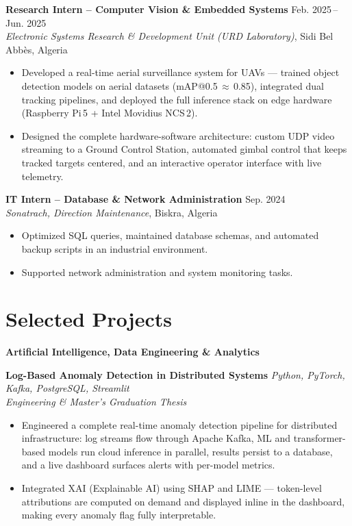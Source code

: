 \documentclass[10pt, letterpaper]{article}
\begin{document}
\textbf{Research Intern -- Computer Vision \& Embedded Systems} \hfill Feb. 2025\,--\,Jun. 2025\\
\textit{Electronic Systems Research \& Development Unit (URD Laboratory)}, Sidi Bel Abb\`es, Algeria
\begin{itemize}
  \item Developed a real-time aerial surveillance system for UAVs --- trained object detection models on aerial datasets (mAP@0.5\,$\approx$\,0.85), integrated dual tracking pipelines, and deployed the full inference stack on edge hardware (Raspberry Pi\,5 + Intel Movidius NCS\,2).
  \item Designed the complete hardware-software architecture: custom UDP video streaming to a Ground Control Station, automated gimbal control that keeps tracked targets centered, and an interactive operator interface with live telemetry.
\end{itemize}

\vspace{5pt}

\textbf{IT Intern -- Database \& Network Administration} \hfill Sep. 2024\\
\textit{Sonatrach, Direction Maintenance}, Biskra, Algeria
\begin{itemize}
  \item Optimized SQL queries, maintained database schemas, and automated backup scripts in an industrial environment.
  \item Supported network administration and system monitoring tasks.
\end{itemize}

\section{Selected Projects}

\noindent\textbf{Artificial Intelligence, Data Engineering \& Analytics}

\vspace{3pt}

\textbf{Log-Based Anomaly Detection in Distributed Systems} \hfill \textit{Python, PyTorch, Kafka, PostgreSQL, Streamlit}\\
{\small\textit{Engineering \& Master's Graduation Thesis}}
\begin{itemize}
  \item Engineered a complete real-time anomaly detection pipeline for distributed infrastructure: log streams flow through Apache Kafka, ML and transformer-based models run cloud inference in parallel, results persist to a database, and a live dashboard surfaces alerts with per-model metrics.
  \item Integrated XAI (Explainable AI) using SHAP and LIME --- token-level attributions are computed on demand and displayed inline in the dashboard, making every anomaly flag fully interpretable.
\end{itemize}
\end{document}
